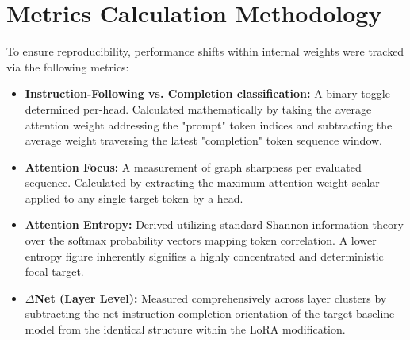 \documentclass[10pt,a4paper]{article}
\begin{document}
\section*{Metrics Calculation Methodology}
To ensure reproducibility, performance shifts within internal weights were tracked via the following metrics:
\begin{itemize}
  \item \textbf{Instruction-Following vs. Completion classification:} A binary toggle determined per-head. Calculated mathematically by taking the average attention weight addressing the "prompt" token indices and subtracting the average weight traversing the latest "completion" token sequence window.
  \item \textbf{Attention Focus:} A measurement of graph sharpness per evaluated sequence. Calculated by extracting the maximum attention weight scalar applied to any single target token by a head.
  \item \textbf{Attention Entropy:} Derived utilizing standard Shannon information theory over the softmax probability vectors mapping token correlation. A lower entropy figure inherently signifies a highly concentrated and deterministic focal target.
  \item \textbf{$\Delta$Net (Layer Level):} Measured comprehensively across layer clusters by subtracting the net instruction-completion orientation of the target baseline model from the identical structure within the LoRA modification.
\end{itemize}
\end{document}
